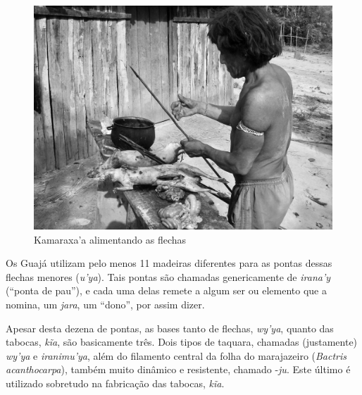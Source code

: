 \begin{figure}[H]
\centering
  \includegraphics[width=\textwidth]{./imgs/100_5107}
\caption{Kamaraxa’a alimentando as flechas}
\end{figure}

Os Guajá utilizam pelo menos 11 madeiras diferentes para as pontas
dessas flechas menores (\emph{u'ya}). Tais pontas são chamadas
genericamente de \emph{irana'y} (``ponta de pau''), e cada uma delas
remete a algum ser ou elemento que a nomina, um \emph{jara}, um
``dono'', por assim dizer.


Apesar desta dezena de pontas, as bases tanto de flechas, \emph{wy'ya},
quanto das tabocas, \emph{kĩa}, são basicamente três. Dois tipos de
taquara, chamadas (justamente) \emph{wy'ya} e \emph{iranimu'ya}, além do
filamento central da folha do marajazeiro (\emph{Bactris acanthocarpa}),
também muito dinâmico e resistente, chamado -\emph{ju}. Este último é
utilizado sobretudo na fabricação das tabocas, \emph{kĩa}.

